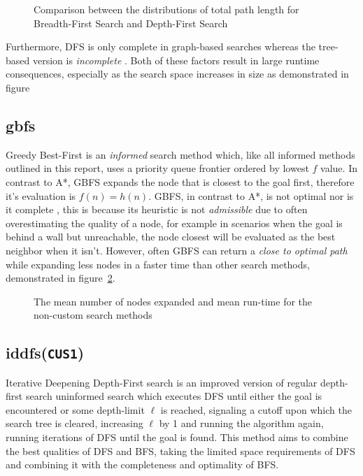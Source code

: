 \begin{figure}[H]
	\hfill
	\hfill
	\caption{Comparison between the distributions of total path length for Breadth-First Search and Depth-First Search}
	\label{fig:dfs_bfs_length}
\end{figure}

Furthermore, DFS is only complete in graph-based searches whereas the tree-based version is \textit{incomplete} \parencite[86]{aiama}. Both of these factors result in large runtime consequences, especially as the search space increases in size as demonstrated in figure %

\subsection{\texorpdfstring{\acrfull{gbfs}}{GBFS}} %
\label{sub:gbfs}
Greedy Best-First is an \textit{informed} search method which, like all informed methods outlined in this report, uses a priority queue frontier ordered by lowest $f$ value. In contrast to A*, GBFS expands the node that is closest to the goal first, therefore it's evaluation is $f(n)=h(n)$. GBFS, in contrast to A*, is not optimal nor is it complete \parencite{aiasa}, this is because its heuristic is not \textit{admissible} due to often overestimating the quality of a node, for example in scenarios when the goal is behind a wall but unreachable, the node closest will be evaluated as the best neighbor when it isn't. However, often GBFS can return a \textit{close to optimal path} while expanding less nodes in a faster time than other search methods, demonstrated in figure~\ref{fig:mean_runtime_expanded}.

\begin{figure}[H]
	\hfill
	\hfill
	\caption{The mean number of nodes expanded and mean run-time for the non-custom search methods}
	\label{fig:mean_runtime_expanded}
\end{figure}


\subsection{\texorpdfstring{\acrfull{iddfs}(\texttt{CUS1})}{IDDFS}} %
\label{sub:iddfs}
Iterative Deepening Depth-First search is an improved version of regular depth-first search uninformed search which executes DFS until either the goal is encountered or some depth-limit $\ell$ is reached, signaling a cutoff upon which the search tree is cleared, increasing $\ell$ by 1 and running the algorithm again, running iterations of DFS until the goal is found. This method aims to combine the best qualities of DFS and BFS, taking the limited space requirements of DFS and combining it with the completeness and optimality of BFS.

